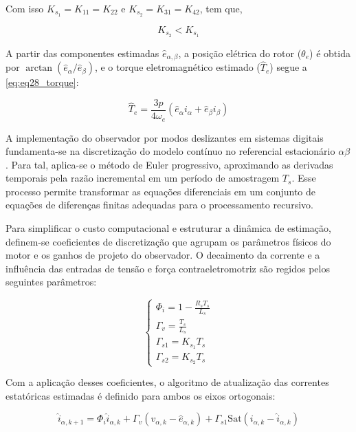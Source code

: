 Com isso $K_{s_1} = K_{11} = K_{22}$ e $K_{s_2} = K_{31} = K_{42}$, tem que,

\begin{equation}
    K_{s_{2}} <  K_{s_{1}}
\end{equation}

A partir das componentes estimadas $\hat{e}_{\alpha,\beta}$, a posição elétrica do rotor ($\theta_e$) é obtida por $\arctan(\hat{e}_{\alpha}/\hat{e}_{\beta})$, e o torque eletromagnético estimado ($\hat{T}_e$) segue a \autoref{eq:eq28_torque}:

\begin{equation}
    \hat{T}_e = \frac{3p}{4\omega_e} (\hat{e}_{\alpha} i_{\alpha} + \hat{e}_{\beta} i_{\beta})
    \label{eq:eq28_torque}
\end{equation}


A implementação do observador por modos deslizantes em sistemas digitais fundamenta-se na discretização do modelo contínuo no referencial estacionário $\alpha\beta$. Para tal, aplica-se o método de Euler progressivo, aproximando as derivadas temporais pela razão incremental em um período de amostragem $T_s$. Esse processo permite transformar as equações diferenciais em um conjunto de equações de diferenças finitas adequadas para o processamento recursivo.

Para simplificar o custo computacional e estruturar a dinâmica de estimação, definem-se coeficientes de discretização que agrupam os parâmetros físicos do motor e os ganhos de projeto do observador. O decaimento da corrente e a influência das entradas de tensão e força contraeletromotriz são regidos pelos seguintes parâmetros:

\begin{equation}
    \label{eq:discretizacao_coeff_smo}
    \begin{cases}  
    \Phi_{i} = 1 - \frac{R_{s} T_{s}}{L_{s}} \\
    \Gamma_{v} = \frac{T_{s}}{L_{s}} \\ 
    \Gamma_{s1} = K_{s_1} T_{s}\\ 
    \Gamma_{s2} = K_{s_2} T_{s}
    \end{cases}
\end{equation}

Com a aplicação desses coeficientes, o algoritmo de atualização das correntes estatóricas estimadas é definido para ambos os eixos ortogonais:

\begin{equation}
    \hat{i}_{\alpha,k+1} = \Phi_{i} \hat{i}_{\alpha,k} + \Gamma_{v} (v_{\alpha,k} - \hat{e}_{\alpha,k}) + \Gamma_{s1} \text{Sat}(i_{\alpha,k} - \hat{i}_{\alpha,k})
\end{equation}

